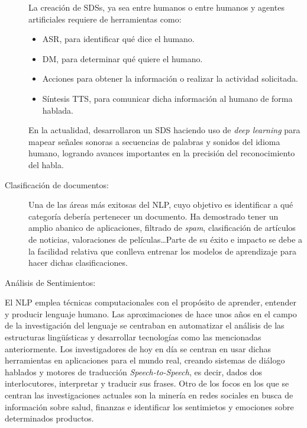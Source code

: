 \begin{description}
    La creación de \acp{SDS}, ya sea entre humanos o entre humanos y agentes
    artificiales requiere de herramientas como:
    \begin{itemize}
    \item \ac{ASR}, para identificar qué dice el humano.
    \item \ac{DM}, para determinar qué
      quiere el humano.
    \item Acciones para obtener la información o realizar la actividad
      solicitada.
    \item Síntesis \ac{TTS}, para
      comunicar dicha información al humano de forma hablada.
    \end{itemize}
    En la actualidad, \citet{microsoft:sds} desarrollaron un \ac{SDS} haciendo
    uso de \emph{deep learning} para mapear señales sonoras a secuencias de
    palabras y sonidos del idioma humano, logrando avances importantes en la
    precisión del reconocimiento del habla.
  \item[Clasificación de documentos:] Una de las áreas más exitosas del
    \ac{NLP}, cuyo objetivo es identificar a qué categoría debería pertenecer un
    documento. Ha demostrado tener un amplio abanico de aplicaciones, \eg
    filtrado de \emph{spam}, clasificación de artículos de noticias,
    valoraciones de películas\dots Parte de su éxito e impacto se debe a la
    facilidad relativa que conlleva entrenar los modelos de aprendizaje para
    hacer dichas clasificaciones.
  \item[Análisis de Sentimientos:]
\end{description}

El \ac{NLP} emplea técnicas computacionales con el propósito de aprender,
entender y producir lenguaje humano. Las aproximaciones de hace unos años en el
campo de la investigación del lenguaje se centraban en automatizar el análisis
de las estructuras lingüísticas y desarrollar tecnologías como las mencionadas
anteriormente. Los investigadores de hoy en día se centran en usar dichas
herramientas en aplicaciones para el mundo real, creando sistemas de diálogo
hablados y motores de traducción \emph{Speech-to-Speech}, es decir, dados dos
interlocutores, interpretar y traducir sus frases. Otro de los focos en los que
se centran las investigaciones actuales son la minería en redes sociales en
busca de información sobre salud, finanzas e identificar los sentimietos y
emociones sobre determinados productos.

